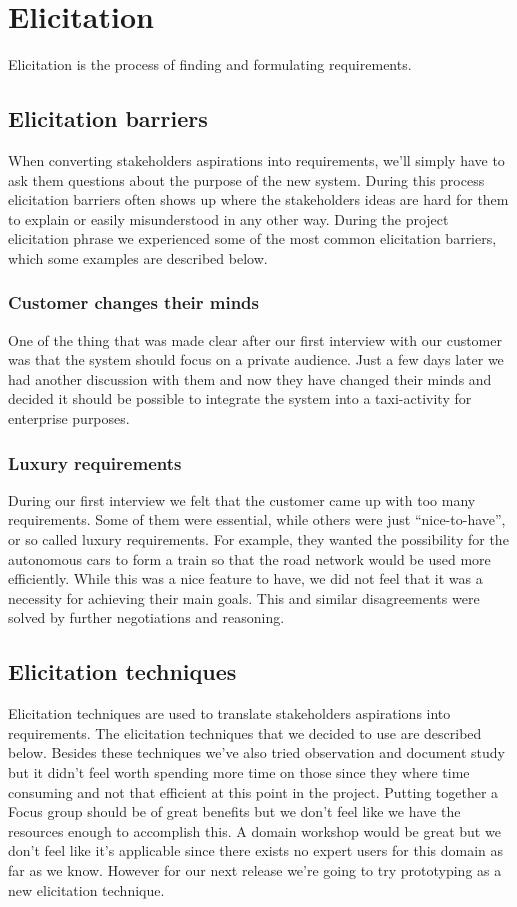 \documentclass[10pt]{article}
\begin{document}
\section{Elicitation}
\sloppy
\noindent Elicitation is the process of finding and formulating requirements.
\subsection{Elicitation barriers}
When converting stakeholders aspirations into requirements, we'll simply have to ask them questions about the purpose of the new system. During this process elicitation barriers often shows up where the stakeholders ideas are hard for them to explain or easily misunderstood in any other way.
During the project elicitation phrase we experienced some of the most common elicitation barriers, which some examples are described below.

\subsubsection{Customer changes their minds}
One of the thing that was made clear after our first interview with our customer was that the system should focus on a private audience. Just a few days later we had another discussion with them and now they have changed their minds and decided it should be possible to integrate the system into a taxi-activity for enterprise purposes.

\subsubsection{Luxury requirements}
During our first interview we felt that the customer came up with too many requirements. Some of them were essential, while others were just “nice-to-have”, or so called luxury requirements. For example, they wanted the possibility for the autonomous cars to form a train so that the road network would be used more efficiently. While this was a nice feature to have, we did not feel that it was a necessity for achieving their main goals. This and similar disagreements were solved by further negotiations and reasoning. 

\subsection{Elicitation techniques}
Elicitation techniques are used to translate stakeholders aspirations into requirements.
The elicitation techniques that we decided to use are described below.
Besides these techniques we’ve also tried observation and document study but it didn't feel worth spending more time on those since they where time consuming and not that efficient at this point in the project.
Putting together a Focus group should be of great benefits but we don’t feel like we have the resources enough to accomplish this.
A domain workshop would be great but we don't feel like it's applicable since there exists no expert users for this domain as far as we know.
However for our next release we're going to try prototyping as a new elicitation technique.
\end{document}
